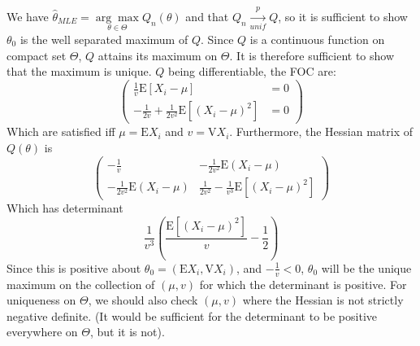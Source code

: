 \documentclass[11pt,letterpaper]{article}                  %
\begin{document}
\begin{problem}
We have $\hat{\theta}_{MLE} = \underset{\theta \in \Theta}{\arg\max}
Q_n(\theta)$ and that $Q_n \xrightarrow[unif]{p} Q$, so it is
sufficient to show $\theta_0$ is the well separated maximum of
$Q$. Since $Q$ is a continuous function on compact set $\Theta$,
$Q$ attains its maximum on $\Theta$. It is therefore sufficient to
show that the maximum is unique. $Q$ being differentiable, the FOC
are:
\begin{equation*}
  \begin{pmatrix}
    \tfrac{1}{v} \mathrm{E}[X_i - \mu] & =0\\ -\tfrac{1}{2v} +
    \tfrac{1}{2v^2}\mathrm{E}\left[(X_i - \mu)^2\right] & =0
  \end{pmatrix}
\end{equation*}
Which are satisfied iff $\mu = \mathrm{E}X_i$ and $v = \mathrm{V}X_i$.
Furthermore, the Hessian matrix of $Q(\theta)$ is
\begin{equation*}
\begin{pmatrix}
  -\tfrac{1}{v} & -\tfrac{1}{2v^2} \mathrm{E}(X_i - \mu) \\ -\tfrac{1}{2v^2} \mathrm{E}(X_i
  - \mu) & \tfrac{1}{2v^2} - \tfrac{1}{v^3} \mathrm{E}\left[(X_i-\mu)^2\right]
\end{pmatrix}
\end{equation*}
Which has determinant
\begin{equation*}
  \frac{1}{v^3}\left( \frac{\mathrm{E}\left[(X_i-\mu)^2\right]}{v} -
  \frac{1}{2} \right)
\end{equation*}
Since this is positive about $\theta_0 = \left(\mathrm{E}X_i,
  \mathrm{V}X_i\right)$, and $-\tfrac{1}{v}<0$, $\theta_0$ will
be the unique maximum on the collection of $(\mu,v)$ for which the
determinant is positive. For uniqueness on $\Theta$, we
should also check $(\mu, v)$ where the Hessian is
not strictly negative definite. (It would be
sufficient for the determinant to be
positive everywhere on $\Theta$, but it is not).


\end{problem}
\end{document}
